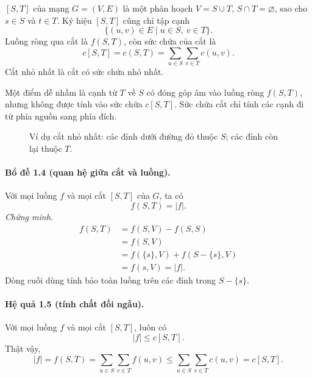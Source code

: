 \documentclass[11pt]{article}
\begin{document}
 \([S,T]\) của mạng \(G=(V,E)\) là một phân hoạch \(V=S\cup T\),
\(S\cap T=\varnothing\), sao cho \(s\in S\) và \(t\in T\). Ký hiệu \([S,T]\)
cũng chỉ tập cạnh
\[
  \{(u,v)\in E\mid u\in S,\ v\in T\}.
\]
Luồng ròng qua cắt là \(f(S,T)\), còn sức chứa của cắt là
\[
  c[S,T]=c(S,T)=\sum_{u\in S}\sum_{v\in T} c(u,v).
\]
Cắt nhỏ nhất là cắt có sức chứa nhỏ nhất.

Một điểm dễ nhầm là cạnh từ \(T\) về \(S\) có đóng góp âm vào luồng ròng
\(f(S,T)\), nhưng không được tính vào sức chứa \(c[S,T]\). Sức chứa cắt chỉ
tính các cạnh đi từ phía nguồn sang phía đích.

\begin{figure}[htbp]
\centering
{}
\caption{Ví dụ cắt nhỏ nhất: các đỉnh dưới đường đỏ thuộc \(S\); các đỉnh còn
lại thuộc \(T\).}
\end{figure}

\paragraph{Bổ đề 1.4 (quan hệ giữa cắt và luồng).}
Với mọi luồng \(f\) và mọi cắt \([S,T]\) của \(G\), ta có
\[
  f(S,T)=|f|.
\]
\emph{Chứng minh.}
\[
\begin{aligned}
f(S,T)&=f(S,V)-f(S,S)\\
      &=f(S,V)\\
      &=f(\{s\},V)+f(S-\{s\},V)\\
      &=f(s,V)=|f|.
\end{aligned}
\]
Dòng cuối dùng tính bảo toàn luồng trên các đỉnh trong \(S-\{s\}\).

\paragraph{Hệ quả 1.5 (tính chất đối ngẫu).}
Với mọi luồng \(f\) và mọi cắt \([S,T]\), luôn có
\[
  |f|\le c[S,T].
\]
Thật vậy,
\[
  |f|=f(S,T)=\sum_{u\in S}\sum_{v\in T} f(u,v)
  \le \sum_{u\in S}\sum_{v\in T} c(u,v)=c[S,T].
\]
\end{document}
